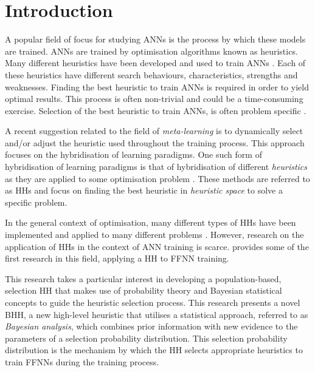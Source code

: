 \section{Introduction}
\label{sec:introduction}

A popular field of focus for studying \acfp{ANN} is the process by which these models are trained. \acp{ANN} are trained by optimisation algorithms known as heuristics. Many different heuristics have been developed and used to train \acp{ANN} \cite{ref:rakitianskaia:2012}. Each of these heuristics have different search behaviours, characteristics, strengths and weaknesses. Finding the best heuristic to train \acp{ANN} is required in order to yield optimal results. This process is often non-trivial and could be a time-consuming exercise. Selection of the best heuristic to train \acp{ANN}, is often problem specific \cite{ref:allen:1996}.

A recent suggestion related to the field of \textit{meta-learning} is to dynamically select and/or adjust the heuristic used throughout the training process. This approach focuses on the hybridisation of learning paradigms. One such form of hybridisation of learning paradigms is that of hybridisation of different \textit{heuristics} as they are applied to some optimisation problem \cite{ref:burke:2013}. These methods are referred to as \acfp{HH} and focus on finding the best heuristic in \textit{heuristic space} to solve a specific problem.

In the general context of optimisation, many different types of \acp{HH} have been implemented and applied to many different problems \cite{ref:burke:2013}. However, research on the application of \acp{HH} in the context of \acs{ANN} training is scarce. \citeauthor{ref:nel:2021} \cite{ref:nel:2021} provides some of the first research in this field, applying a \acs{HH} to \acf{FFNN} training.

This research takes a particular interest in developing a population-based, selection \acs{HH} that makes use of probability theory and Bayesian statistical concepts to guide the heuristic selection process. This research presents a novel \acf{BHH}, a new high-level heuristic that utilises a statistical approach, referred to as \textit{Bayesian analysis}, which combines prior information with new evidence to the parameters of a selection probability distribution. This selection probability distribution is the mechanism by which the \acs{HH} selects appropriate heuristics to train \acp{FFNN} during the training process.

